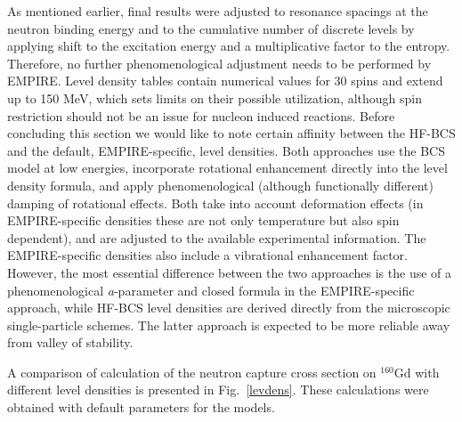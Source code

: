 \documentclass[twocolumn,amsmath,amssymb,10pt,groupedaddress,letter]{revtex4}
\begin{document}
 As mentioned earlier, final results were
adjusted to resonance spacings at the neutron binding energy and to
the cumulative number of discrete levels by applying shift to the
excitation energy and a multiplicative factor to the entropy. Therefore,
no further phenomenological adjustment needs to be performed by EMPIRE.
Level density tables contain numerical values for 30 spins and extend
up to 150 MeV, which sets limits on their possible utilization, although
spin restriction should not be an issue for nucleon induced reactions.
Before concluding this section we would like to note certain affinity
between the HF-BCS and the default, EMPIRE-specific,
level densities. Both approaches use the BCS
model at low energies, incorporate rotational enhancement directly
into the level density formula, and apply phenomenological (although
functionally different) damping of rotational effects. Both take into
account deformation effects (in EMPIRE-specific densities these are
not only temperature but also spin dependent), and are adjusted to
the available experimental information. The EMPIRE-specific densities
also include a vibrational enhancement factor. However, the most essential
difference between the two approaches is the use of a phenomenological
\emph{a}-parameter and closed formula in the EMPIRE-specific approach,
while HF-BCS level densities
are derived directly from the microscopic single-particle schemes.
The latter approach is expected to be more reliable away from valley
of stability.

A comparison of  calculation of the neutron capture cross section on $^{160}$Gd
with different level densities is presented in Fig.~\ref{levdens}. These
calculations were obtained with default parameters for the models.

\medskip
\end{document}
